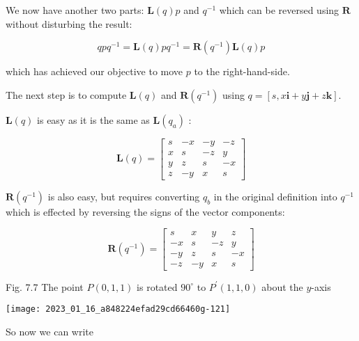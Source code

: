 We now have another two parts: $\mathbf{L}(q) p$ and $q^{-1}$ which can be reversed using $\mathbf{R}$ without disturbing the result:

$$
q p q^{-1}=\mathbf{L}(q) p q^{-1}=\mathbf{R}\left(q^{-1}\right) \mathbf{L}(q) p
$$

which has achieved our objective to move $p$ to the right-hand-side.

The next step is to compute $\mathbf{L}(q)$ and $\mathbf{R}\left(q^{-1}\right)$ using $q=[s, x \mathbf{i}+y \mathbf{j}+z \mathbf{k}]$.

$\mathbf{L}(q)$ is easy as it is the same as $\mathbf{L}\left(q_{a}\right)$ :

$$
\mathbf{L}(q)=\left[\begin{array}{cccc}
s & -x & -y & -z \\
x & s & -z & y \\
y & z & s & -x \\
z & -y & x & s
\end{array}\right]
$$

$\mathbf{R}\left(q^{-1}\right)$ is also easy, but requires converting $q_{b}$ in the original definition into $q^{-1}$ which is effected by reversing the signs of the vector components:

$$
\mathbf{R}\left(q^{-1}\right)=\left[\begin{array}{cccc}
s & x & y & z \\
-x & s & -z & y \\
-y & z & s & -x \\
-z & -y & x & s
\end{array}\right]
$$

Fig. 7.7 The point $P(0,1,1)$ is rotated $90^{\circ}$ to $P^{\prime}(1,1,0)$ about the $y$-axis

\begin{center}
\texttt{[image: 2023\_01\_16\_a848224efad29cd66460g-121]}
\end{center}

So now we can write

